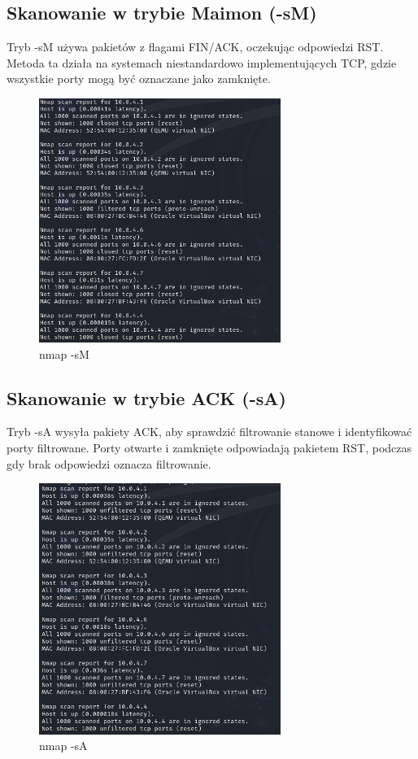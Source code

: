 \documentclass{article}
\begin{document}
\subsection*{Skanowanie w trybie Maimon (-sM)}
Tryb -sM używa pakietów z flagami FIN/ACK, oczekując odpowiedzi RST. Metoda ta działa na systemach niestandardowo implementujących TCP, gdzie wszystkie porty mogą być oznaczane jako zamknięte.

\begin{figure}[H]
  \centering
  \includegraphics[width=0.7\textwidth]{nmap_sM.png}
  \caption{nmap -sM}
\end{figure}

\subsection*{Skanowanie w trybie ACK (-sA)}
Tryb -sA wysyła pakiety ACK, aby sprawdzić filtrowanie stanowe i identyfikować porty filtrowane. Porty otwarte i zamknięte odpowiadają pakietem RST, podczas gdy brak odpowiedzi oznacza filtrowanie.

\begin{figure}[H]
  \centering
  \includegraphics[width=0.7\textwidth]{nmap_sA.png}
  \caption{nmap -sA}
\end{figure}
\end{document}
